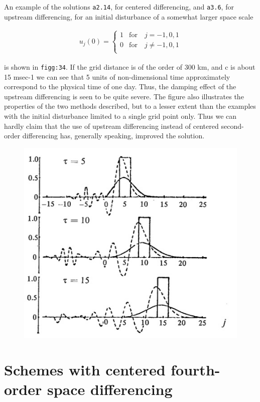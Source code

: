 An example of the solutions \texttt{a2.14}, for centered differencing,
and \texttt{a3.6}, for upstream differencing, for an initial disturbance
of a somewhat larger space scale

\[\begin{aligned}
   u_{j}(0) = \left\{ \begin{array}{cc}
                       1  &\textrm{for} \quad j = -1,0,1\\
                       0  &\textrm{for} \quad j \neq -1,0,1\\
   \end{array} \right.
\end{aligned}\]

is shown in \texttt{figg:34}. If the grid distance is of the order of
300 km, and c is about 15 msec-1 we can see that 5 units of
non-dimensional time approximately correspond to the physical time of
one day. Thus, the damping effect of the upstream differencing is seen
to be quite severe. The figure also illustrates the properties of the
two methods described, but to a lesser extent than the examples with the
initial disturbance limited to a single grid point only. Thus we can
hardly claim that the use of upstream differencing instead of centered
second-order differencing has, generally speaking, improved the
solution.

\begin{figure}
 \centering
 \includegraphics[width = .7 \textwidth]{figs/NM/pic34.jpg}
 \caption{} \label{fig:}
\end{figure}

\section{Schemes with centered fourth-order
space
differencing}\label{sec:schemes-with-centered-fourth-order-space-differencing}

